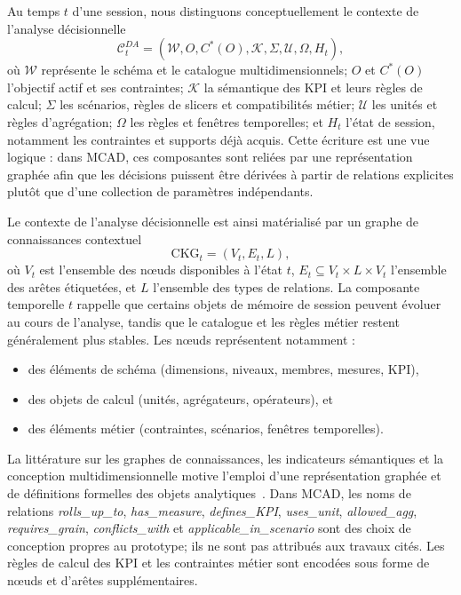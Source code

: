 \documentclass[journal]{IEEEtran}
\begin{document}
Au temps $t$ d'une session, nous distinguons conceptuellement le contexte de l'analyse décisionnelle
\[
\mathcal{C}^{DA}_t=(\mathcal{W},O,C^*(O),\mathcal{K},\Sigma,\mathcal{U},\Omega,H_t),
\]
où $\mathcal{W}$ représente le schéma et le catalogue multidimensionnels; $O$ et $C^*(O)$ l'objectif actif et ses contraintes; $\mathcal{K}$ la sémantique des KPI et leurs règles de calcul; $\Sigma$ les scénarios, règles de slicers et compatibilités métier; $\mathcal{U}$ les unités et règles d'agrégation; $\Omega$ les règles et fenêtres temporelles; et $H_t$ l'état de session, notamment les contraintes et supports déjà acquis. Cette écriture est une vue logique : dans MCAD, ces composantes sont reliées par une représentation graphée afin que les décisions puissent être dérivées à partir de relations explicites plutôt que d'une collection de paramètres indépendants.

Le contexte de l'analyse décisionnelle est ainsi matérialisé par un graphe de connaissances contextuel
\[
\mathrm{CKG}_t=(V_t,E_t,L),
\]
où $V_t$ est l'ensemble des nœuds disponibles à l'état $t$, $E_t\subseteq V_t\times L\times V_t$ l'ensemble des arêtes étiquetées, et $L$ l'ensemble des types de relations. La composante temporelle $t$ rappelle que certains objets de mémoire de session peuvent évoluer au cours de l'analyse, tandis que le catalogue et les règles métier restent généralement plus stables. Les nœuds représentent notamment :
\begin{itemize}
  \item des éléments de schéma (dimensions, niveaux, membres, mesures, KPI),
  \item des objets de calcul (unités, agrégateurs, opérateurs), et
  \item des éléments métier (contraintes, scénarios, fenêtres temporelles).
\end{itemize}
La littérature sur les graphes de connaissances, les indicateurs sémantiques et la conception multidimensionnelle motive l'emploi d'une représentation graphée et de définitions formelles des objets analytiques~\cite{HoganKGSurvey2021,DiamantiniKPISurvey2025,RomeroAbello2010}. Dans MCAD, les noms de relations \textit{rolls\_up\_to}, \textit{has\_measure}, \textit{defines\_KPI}, \textit{uses\_unit}, \textit{allowed\_agg}, \textit{requires\_grain}, \textit{conflicts\_with} et \textit{applicable\_in\_scenario} sont des choix de conception propres au prototype; ils ne sont pas attribués aux travaux cités. Les règles de calcul des KPI et les contraintes métier sont encodées sous forme de nœuds et d'arêtes supplémentaires.
\end{document}
